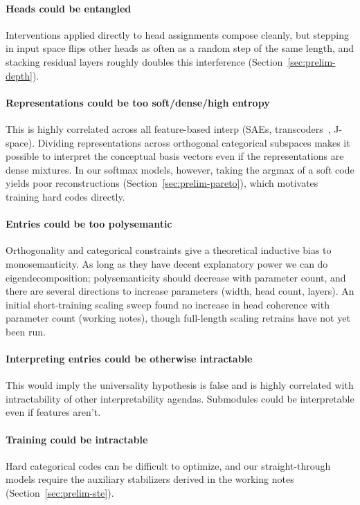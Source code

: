 \paragraph{Heads could be entangled}
Interventions applied directly to head assignments compose cleanly, but
stepping in input space flips other heads as often as a random step of
the same length, and stacking residual layers roughly doubles this
interference (Section~\ref{sec:prelim-depth}).

\paragraph{Representations could be too soft/dense/high entropy}
This is highly correlated across all feature-based interp (SAEs,
transcoders~\cite{dunefsky2024}, J-space). Dividing representations across orthogonal
categorical subspaces makes it possible to interpret the conceptual
basis vectors even if the representations are dense mixtures. In our
softmax models, however, taking the argmax of a soft code yields poor
reconstructions (Section~\ref{sec:prelim-pareto}), which motivates
training hard codes directly.

\paragraph{Entries could be too polysemantic}
Orthogonality and categorical constraints give a theoretical inductive
bias to monosemanticity. As long as they have decent explanatory power
we can do eigendecomposition; polysemanticity should decrease with
parameter count, and there are several directions to increase parameters
(width, head count, layers). An initial short-training scaling sweep
found no increase in head coherence with parameter count (working
notes), though full-length scaling retrains have not yet been run.

\paragraph{Interpreting entries could be otherwise intractable}
This would imply the universality hypothesis is false and is highly
correlated with intractability of other interpretability agendas.
Submodules could be interpretable even if features aren't.

\paragraph{Training could be intractable}
Hard categorical codes can be difficult to optimize, and our
straight-through models require the auxiliary stabilizers derived in the
working notes (Section~\ref{sec:prelim-ste}).


